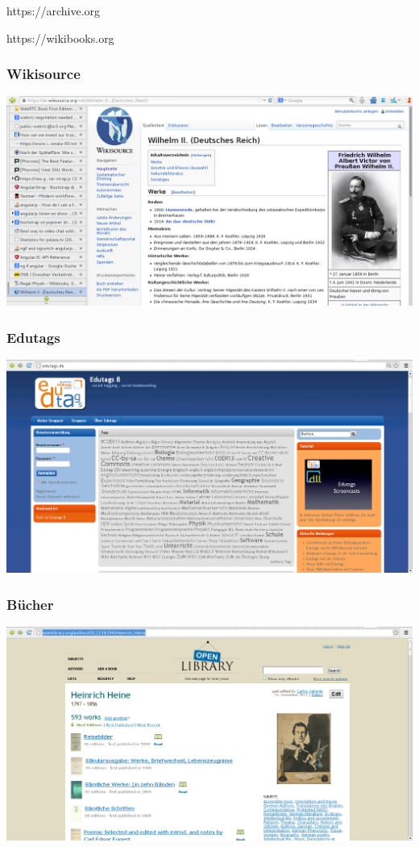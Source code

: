 \documentclass[table]{beamer}
\begin{document}
\begin{frame}
    \begin{center}\Large
      https://archive.org
    \end {center}
\end{frame}

\begin{frame}
    \begin{center}\Large
      https://wikibooks.org
    \end {center}
\end{frame}

\begin{frame}
  \frametitle{Wikisource}
  \includegraphics[width=\textwidth]{img/wikisource.png}
\end{frame}

\begin{frame}
  \frametitle{Edutags}
  \includegraphics[width=\textwidth]{img/edutags.png}
\end{frame}

\begin{frame}
  \frametitle{Bücher}
  \includegraphics[width=\textwidth]{img/openlibrary.png}
\end{frame}
\end{document}
